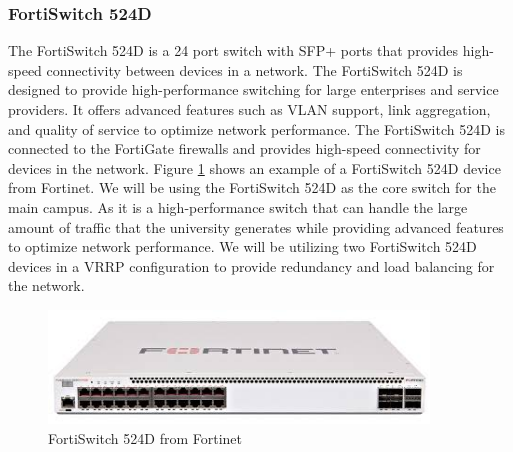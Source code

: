 \documentclass[12pt]{report}
\begin{document}
\subsubsection{FortiSwitch 524D}
The FortiSwitch 524D is a 24 port switch with SFP+ ports that provides high-speed connectivity between devices in a network. The FortiSwitch 524D is designed to provide high-performance switching for large enterprises and service providers. It offers advanced features such as VLAN support, link aggregation, and quality of service to optimize network performance. The FortiSwitch 524D is connected to the FortiGate firewalls and provides high-speed connectivity for devices in the network\cite{524D}. Figure \ref{fig:524D} shows an example of a FortiSwitch 524D device from Fortinet. We will be using the FortiSwitch 524D as the core switch for the main campus. As it is a high-performance switch that can handle the large amount of traffic that the university generates while providing advanced features to optimize network performance. We will be utilizing two FortiSwitch 524D devices in a VRRP configuration to provide redundancy and load balancing for the network.
\begin{figure}[h]
    \centering
    \includegraphics[width=0.9\textwidth]{images/524D.jpg}
    \caption{FortiSwitch 524D from Fortinet \cite{524DIMG}}
    \label{fig:524D}
\end{figure}
\newpage
\end{document}
